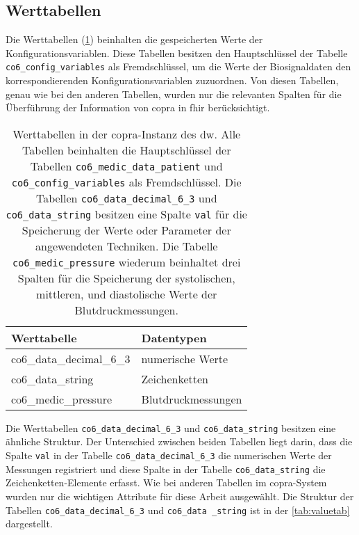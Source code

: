 \subsection{Werttabellen} \label{subsec:valuetables}

Die Werttabellen (\ref{tab:valuetable}) beinhalten die gespeicherten Werte der Konfigurationsvariablen. Diese Tabellen besitzen den Hauptschlüssel der Tabelle \texttt{co6\_config\_variables} als Fremdschlüssel, um die Werte der Biosignaldaten den korrespondierenden Konfigurationsvariablen zuzuordnen. Von diesen Tabellen, genau wie bei den anderen Tabellen, wurden nur die relevanten Spalten für die Überführung der Information von \ac{copra} in \ac{fhir} berücksichtigt.

\begin{table}[ht]
	\centering  
	\caption[Werttabellen in der \acs{copra}-Instanz]{Werttabellen in der \ac{copra}-Instanz des \ac{dw}. Alle Tabellen beinhalten die Hauptschlüssel der Tabellen \texttt{co6\_medic\_data\_patient} und \texttt{co6\_config\_variables} als Fremdschlüssel. Die Tabellen \texttt{co6\_data\_decimal\_6\_3} und \texttt{co6\_data\_string} besitzen eine Spalte \texttt{val} für die Speicherung der Werte oder Parameter der angewendeten Techniken. Die Tabelle \texttt{co6\_medic\_pressure} wiederum beinhaltet drei Spalten für die Speicherung der systolischen, mittleren, und diastolische Werte der Blutdruckmessungen.}
	\label{tab:valuetable}
	\begin{tabular}{|l|l|}
		\hline
		\rowcolor{lightgray} Werttabelle & Datentypen \\ \hline
		co6\_data\_decimal\_6\_3 & numerische Werte \\ \hline
		co6\_data\_string & Zeichenketten \\ \hline
		co6\_medic\_pressure & Blutdruckmessungen \\ \hline
	\end{tabular}
\end{table}

Die Werttabellen \texttt{co6\_data\_decimal\_6\_3} und \texttt{co6\_data\_string} besitzen eine ähnliche Struktur. Der Unterschied zwischen beiden Tabellen liegt darin, dass die Spalte \texttt{val} in der Tabelle \texttt{co6\_data\_decimal\_6\_3} die numerischen Werte der Messungen registriert und diese Spalte in der Tabelle \texttt{co6\_data\_string} die Zeichenketten-Elemente erfasst. Wie bei anderen Tabellen im \ac{copra}-System wurden nur die wichtigen Attribute für diese Arbeit ausgewählt. Die Struktur der Tabellen \texttt{co6\_data\_decimal\_6\_3} und \texttt{co6\_data \_string} ist in der \ref{tab:valuetab} dargestellt.

